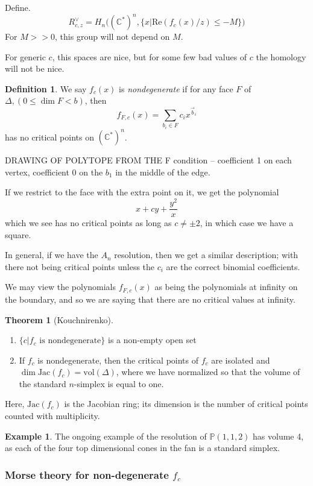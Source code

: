 \documentclass{amsart}
\theoremstyle{definition}
\newtheorem{theorem}[dummy]{Theorem}
\newtheorem{definition}[dummy]{Definition}
\newtheorem{example}[dummy]{Example}
\newcommand{\proj}{\mathbb{P}}
\newcommand{\C}{\mathbb{C}}
\begin{document}
Define.
$$R^\vee_{c,z}=H_n\Big((\C^*)^n,\big\{x\big|\text{Re}(f_c(x)/z)\leq -M\big\}\Big)$$
For $M>>0$, this group will not depend on $M$.

For generic $c$, this spaces are nice, but for some few bad values of $c$ the homology will not be nice.

\begin{definition}
We say $f_c(x)$ is \emph{nondegenerate} if for any face $F$ of $\Delta, (0\leq \dim F < b)$, then
$$f_{F,c}(x)=\sum_{b_i\in F}c_i x^{\vec{b}_i}$$
has no critical points on $(\C^*)^n$. 
\end{definition}

DRAWING OF POLYTOPE FROM THE F condition -- coefficient 1 on each vertex, coefficient 0 on the $b_1$ in the middle of the edge.

If we restrict to the face with the extra point on it, we get the polynomial
$$x+cy+\frac{y^2}{x}$$ which we see has no critical points as long as $c\neq \pm 2$, in which case we have a square.

In general, if we have the $A_n$ resolution, then we get a similar description; with there not being critical points unless the $c_i$ are the correct binomial coefficients.

We may view the polynomials $f_{F,c}(x)$ as being the polynomials at infinity on the boundary, and so we are saying that there are no critical values at infinity.

\begin{theorem}[Kouchnirenko]
\begin{enumerate}
\item $\{c|f_c \text{ is nondegenerate}\}$ is a non-empty open set
\item If $f_c$ is nondegenerate, then the critical points of $f_c$ are isolated and $\dim \text{Jac}(f_c)=\text{vol}(\Delta)$, where we have normalized so that the volume of the standard $n$-simplex is equal to one.
\end{enumerate}

\end{theorem}
Here, $\text{Jac}(f_c)$ is the Jacobian ring; its dimension is the number of critical points counted with multiplicity.

\begin{example}
The ongoing example of the resolution of $\proj(1,1,2)$ has volume 4, as each of the four top dimensional cones in the fan is a standard simplex.
\end{example}


\subsubsection{Morse theory for non-degenerate $f_c$}
\end{document}
